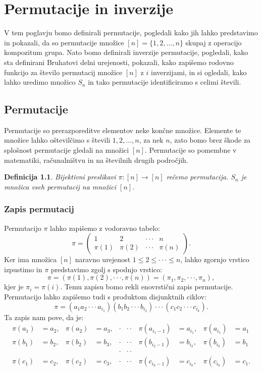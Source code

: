 \documentclass[a4paper, 12pt]{book}
\newtheorem{definicija}{Definicija}[chapter]
\begin{document}
\chapter{ Permutacije in inverzije }

V tem poglavju bomo definirali permutacije, pogledali kako jih lahko predstavimo in pokazali, da so permutacije množice $[n] = \{ 1, 2, \dots, n\}$ skupaj z operacijo kompozitum grupa. Nato bomo definirali inverzije permutacije, pogledali, kako sta definirani Bruhatovi delni urejenosti, pokazali, kako zapišemo rodovno funkcijo za število permutacij množice $[n]$ z $i$ inverzijami, in si ogledali, kako lahko uredimo množico $S_n$ in tako permutacije identificiramo s celimi števili.

\section{ Permutacije }

Permutacije so prerazporeditve elementov neke končne množice. Elemente te množice lahko oštevilčimo s števili $1, 2, \dots, n$, za nek $n$, zato bomo brez škode za splošnost permutacije gledali na množici $[n]$. 
Permutacije so pomembne v matematiki, računalništvu in na številnih drugih področjih. 



\begin{definicija}
Bijektivni preslikavi $\pi: [n] \rightarrow [n]$ rečemo permutacija. $S_n$ je množica vseh permutacij na množici $[n]$.
\end{definicija}

\subsection{ Zapis permutacij }
Permutacijo $\pi$ lahko zapišemo z vodoravno tabelo:
\[
    \pi = \begin{pmatrix}
        1 & 2 & \cdot\cdot\cdot & n \\
        \pi(1) & \pi(2) & \cdot\cdot\cdot & \pi(n)
    \end{pmatrix}.
\]
Ker ima množica $[n]$ naravno urejenost $1 \leq 2 \leq \cdot\cdot\cdot \leq n$, lahko zgornjo vrstico izpustimo in $\pi$ predstavimo zgolj s spodnjo vrstico:
\[
    \pi = (\pi(1), \pi(2), \cdot\cdot\cdot, \pi(n)) = (\pi_1, \pi_2, \cdot\cdot\cdot, \pi_n),
\]
kjer je $\pi_i = \pi(i)$.
Temu zapisu bomo rekli enovrstični zapis permutacije.
Permutacijo lahko zapišemo tudi s produktom disjunktnih ciklov:
\[
    \pi = (a_1 a_2 \cdot\cdot\cdot a_{i_1})(b_1 b_2 \cdot\cdot\cdot b_{i_2}) \cdot\cdot\cdot (c_1 c_2 \cdot\cdot\cdot c_{i_k}).
\]
Ta zapis nam pove, da je:
\begin{align*}
    \pi(a_1) &= a_2, & \pi(a_2) &= a_3, & \cdot&\cdot\cdot & \pi(a_{i_1-1}) &= a_{i_1}, & \pi(a_{i_1}) &= a_1 \\
    \pi(b_1) &= b_2, & \pi(b_2) &= b_3, & \cdot&\cdot\cdot & \pi(b_{i_2-1}) &= b_{i_2}, & \pi(b_{i_2}) &= b_1 \\
    &&&& \cdot&\cdot\cdot \\
    \pi(c_1) &= c_2, & \pi(c_2) &= c_3, & \cdot&\cdot\cdot & \pi(c_{i_k-1}) &= c_{i_k}, & \pi(c_{i_k}) &= c_1.
\end{align*}
\end{document}
